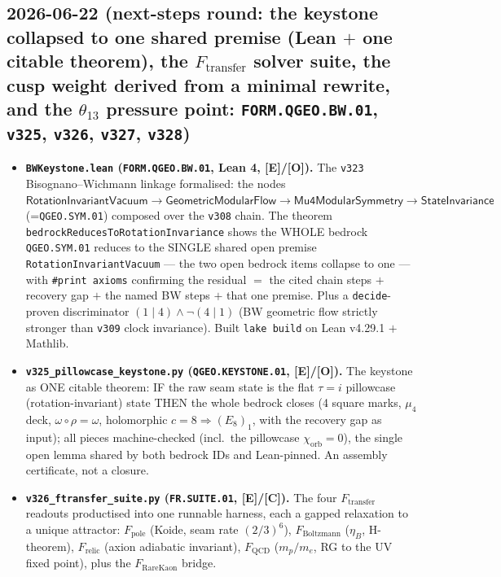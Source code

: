 \documentclass[11pt]{article}
\providecommand{\mE}{\textbf{[E]}}\providecommand{\mC}{\textbf{[C]}}
\providecommand{\mO}{\textbf{[O]}}\providecommand{\mX}{\textbf{[X]}}
\begin{document}
\subsection*{2026-06-22 (next-steps round: the keystone collapsed to one shared premise (Lean $+$ one citable theorem), the $F_{\mathrm{transfer}}$ solver suite, the cusp weight derived from a minimal rewrite, and the $\theta_{13}$ pressure point: \texttt{FORM.QGEO.BW.01}, \texttt{v325}, \texttt{v326}, \texttt{v327}, \texttt{v328})}
\begin{itemize}
\item \textbf{\texttt{BWKeystone.lean} (\texttt{FORM.QGEO.BW.01}, Lean 4, \mE/\mO).} The \texttt{v323} Bisognano--Wichmann
  linkage formalised: the nodes $\textsf{RotationInvariantVacuum}\to\textsf{GeometricModularFlow}\to
  \textsf{Mu4ModularSymmetry}\to\textsf{StateInvariance}$ (=\texttt{QGEO.SYM.01}) composed over the \texttt{v308} chain.
  The theorem \texttt{bedrockReducesToRotationInvariance} shows the WHOLE bedrock \texttt{QGEO.SYM.01} reduces to
  the SINGLE shared open premise \texttt{RotationInvariantVacuum} --- the two open bedrock items collapse to one ---
  with \texttt{\#print axioms} confirming the residual $=$ the cited chain steps $+$ recovery gap $+$ the named BW
  steps $+$ that one premise.  Plus a \texttt{decide}-proven discriminator $(1\mid4)\wedge\neg(4\mid1)$ (BW geometric
  flow strictly stronger than \texttt{v309} clock invariance).  Built \texttt{lake build} on Lean v4.29.1 $+$ Mathlib.
\item \textbf{\texttt{v325\_pillowcase\_keystone.py} (\texttt{QGEO.KEYSTONE.01}, \mE/\mO).} The keystone as ONE
  citable theorem: IF the raw seam state is the flat $\tau{=}i$ pillowcase (rotation-invariant) state THEN the whole
  bedrock closes (4 square marks, $\mu_4$ deck, $\omega\circ\rho{=}\omega$, holomorphic $c{=}8\Rightarrow(E_8)_1$,
  with the recovery gap as input); all pieces machine-checked (incl.\ the pillowcase $\chi_{\mathrm{orb}}{=}0$), the
  single open lemma shared by both bedrock IDs and Lean-pinned.  An assembly certificate, not a closure.
\item \textbf{\texttt{v326\_ftransfer\_suite.py} (\texttt{FR.SUITE.01}, \mE/\mC).} The four $F_{\mathrm{transfer}}$
  readouts productised into one runnable harness, each a gapped relaxation to a unique attractor: $F_{\mathrm{pole}}$
  (Koide, seam rate $(2/3)^6$), $F_{\mathrm{Boltzmann}}$ ($\eta_B$, H-theorem), $F_{\mathrm{relic}}$ (axion adiabatic
  invariant), $F_{\mathrm{QCD}}$ ($m_p/m_e$, RG to the UV fixed point), plus the $F_{\mathrm{RareKaon}}$ bridge.

\end{itemize}
\end{document}
